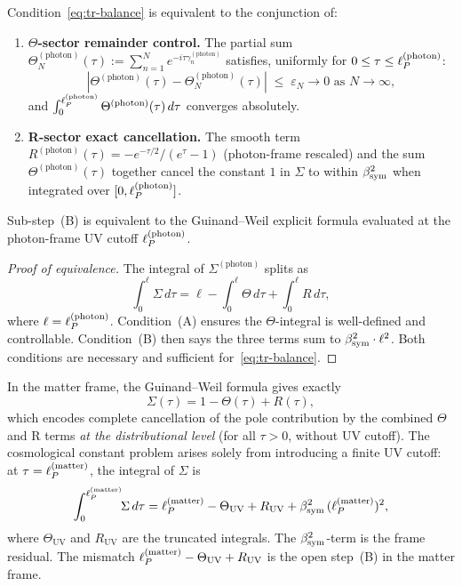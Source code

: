 \begin{proposition}
\label{prop:open-steps}
Condition~\eqref{eq:tr-balance} is equivalent to the conjunction of:
\begin{enumerate}
\item[\textbf{(A)}] \textbf{$\Theta$-sector remainder control.}
  The partial sum $\Theta^{(\mathrm{photon})}_N(\tau) :=
  \sum_{n=1}^N e^{-i\tau\gamma_n^{(\mathrm{photon})}}$
  satisfies, uniformly for $0 \leq \tau \leq \ell_P^{(\mathrm{photon})}$:
  \[
    \left|\Theta^{(\mathrm{photon})}(\tau)
    - \Theta^{(\mathrm{photon})}_N(\tau)\right|
    \;\leq\; \varepsilon_N \to 0 \text{ as } N\to\infty,
  \]
  and $\int_0^{\ell_P^{(\mathrm{photon})}} \Theta^{(\mathrm{photon})}(\tau)\,d\tau$
  converges absolutely.
\item[\textbf{(B)}] \textbf{R-sector exact cancellation.}
  The smooth term $R^{(\mathrm{photon})}(\tau) = -e^{-\tau/2}/(e^\tau-1)$
  (photon-frame rescaled) and the sum
  $\Theta^{(\mathrm{photon})}(\tau)$ together cancel the constant $1$
  in $\Sigma$ to within $\beta_{\mathrm{sym}}^2$ when integrated over
  $[0, \ell_P^{(\mathrm{photon})}]$.
\end{enumerate}
Sub-step~(B) is equivalent to the Guinand--Weil explicit formula
evaluated at the photon-frame UV cutoff $\ell_P^{(\mathrm{photon})}$.
\end{proposition}

\begin{proof}[Proof of equivalence]
The integral of $\Sigma^{(\mathrm{photon})}$ splits as
\[
  \int_0^{\ell} \Sigma\,d\tau
  = \ell - \int_0^\ell \Theta\,d\tau + \int_0^\ell R\,d\tau,
\]
where $\ell = \ell_P^{(\mathrm{photon})}$.
Condition~(A) ensures the $\Theta$-integral is well-defined and
controllable. Condition~(B) then says the three terms sum to
$\beta_{\mathrm{sym}}^2\cdot\ell^2$.
Both conditions are necessary and sufficient for~\eqref{eq:tr-balance}.
\end{proof}

\begin{theorem}
\label{thm:partial-cancel}
In the matter frame, the Guinand--Weil formula gives exactly
\[
  \Sigma(\tau) = 1 - \Theta(\tau) + R(\tau),
\]
which encodes complete cancellation of the pole contribution by the
combined $\Theta$ and R terms \emph{at the distributional level} (for all
$\tau > 0$, without UV cutoff). The cosmological constant problem
arises solely from introducing a finite UV cutoff: at
$\tau = \ell_P^{(\mathrm{matter})}$, the integral of $\Sigma$ is
\[
  \int_0^{\ell_P^{(\mathrm{matter})}}\!\!\Sigma\,d\tau
  = \ell_P^{(\mathrm{matter})} - \Theta_{\mathrm{UV}}
  + R_{\mathrm{UV}} + \beta_{\mathrm{sym}}^2\,(\ell_P^{(\mathrm{matter})})^2,
\]
where $\Theta_{\mathrm{UV}}$ and $R_{\mathrm{UV}}$ are the truncated
integrals. The $\beta_{\mathrm{sym}}^2$-term is the frame residual. The mismatch
$\ell_P^{(\mathrm{matter})} - \Theta_{\mathrm{UV}} + R_{\mathrm{UV}}$
is the open step~(B) in the matter frame.
\end{theorem}

